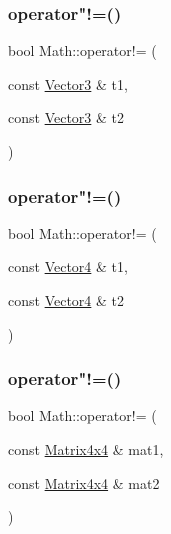 \mbox{\label{namespace_math_acd6ae74465b9e93459c15a638efcdb61}} 
\subsubsection{\texorpdfstring{operator"!=()}{operator!=()}\hspace{0.1cm}{\footnotesize\ttfamily [2/6]}}
{\footnotesize\ttfamily bool Math\+::operator!= (\begin{DoxyParamCaption}\item[{const \mbox{\hyperlink{struct_math_1_1_vector3}{Vector3}} \&}]{t1,  }\item[{const \mbox{\hyperlink{struct_math_1_1_vector3}{Vector3}} \&}]{t2 }\end{DoxyParamCaption})}

\mbox{\label{namespace_math_a363043a928db204744bfb86367be979d}} 
\subsubsection{\texorpdfstring{operator"!=()}{operator!=()}\hspace{0.1cm}{\footnotesize\ttfamily [3/6]}}
{\footnotesize\ttfamily bool Math\+::operator!= (\begin{DoxyParamCaption}\item[{const \mbox{\hyperlink{struct_math_1_1_vector4}{Vector4}} \&}]{t1,  }\item[{const \mbox{\hyperlink{struct_math_1_1_vector4}{Vector4}} \&}]{t2 }\end{DoxyParamCaption})}

\mbox{\label{namespace_math_af3f64c58fbe9c4788f9697c9a12dfdf7}} 
\subsubsection{\texorpdfstring{operator"!=()}{operator!=()}\hspace{0.1cm}{\footnotesize\ttfamily [4/6]}}
{\footnotesize\ttfamily bool Math\+::operator!= (\begin{DoxyParamCaption}\item[{const \mbox{\hyperlink{struct_math_1_1_matrix4x4}{Matrix4x4}} \&}]{mat1,  }\item[{const \mbox{\hyperlink{struct_math_1_1_matrix4x4}{Matrix4x4}} \&}]{mat2 }\end{DoxyParamCaption})}

